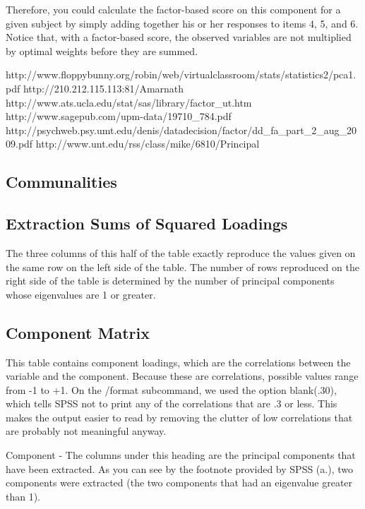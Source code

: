 Therefore, you could calculate the factor-based score on this component for a given subject by
simply adding together his or her responses to items 4, 5, and 6. Notice that, with a factor-based
score, the observed variables are not multiplied by optimal weights before they are summed.




http://www.floppybunny.org/robin/web/virtualclassroom/stats/statistics2/pca1.pdf
http://210.212.115.113:81/Amarnath%
http://www.ats.ucla.edu/stat/sas/library/factor_ut.htm
http://www.sagepub.com/upm-data/19710_784.pdf
http://psychweb.psy.umt.edu/denis/datadecision/factor/dd_fa_part_2_aug_2009.pdf
http://www.unt.edu/rss/class/mike/6810/Principal%
\subsection{Communalities}


\subsection{Extraction Sums of Squared Loadings}

The three columns of this half of the table exactly reproduce the values given on the same row on the left side of the table.  The number of rows reproduced on the right side of the table is determined by the number of principal components whose eigenvalues are 1 or greater.

\subsection{Component Matrix} This table contains component loadings, which are the correlations between the variable and the component.  Because these are correlations, possible values range from -1 to +1.  On the /format subcommand, we used the option blank(.30), which tells SPSS not to print any of the correlations that are .3 or less.  This makes the output easier to read by removing the clutter of low correlations that are probably not meaningful anyway.

Component - The columns under this heading are the principal components that have been extracted.  As you can see by the footnote provided by SPSS (a.), two components were extracted (the two components that had an eigenvalue greater than 1).

